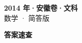 \documentclass[zihao=-4, a4paper]{ctexart}
\begin{document}
\begin{center}
  {\Large\bfseries 2014 年·安徽卷·文科}\\[4pt]
  {\large 数学 · 简答版}
\end{center}
\medskip
{}

\clearpage
{}
\begin{center}{\Large\bfseries 答案速查}\end{center}
\medskip

\end{document}

